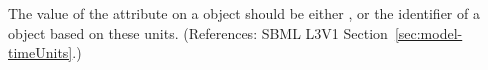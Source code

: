 The value of the attribute  on a \Model object should be
either ,  or the identifier of a
\UnitDefinition object based on these units.  (References: SBML L3V1
Section~\ref{sec:model-timeUnits}.)
